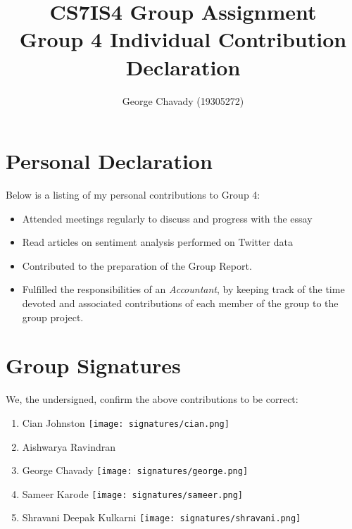 \documentclass[a4paper,10pt]{article}
\begin{document}
\title{
    CS7IS4 Group Assignment \\
    \large Group 4 Individual Contribution Declaration
}
\author{
    George Chavady (19305272)
}

\maketitle

\section{Personal Declaration}

Below is a listing of my personal contributions to Group 4:

\begin{itemize}
    \item {Attended meetings regularly to discuss and progress with the essay}
    \item {Read articles on sentiment analysis performed on Twitter data }
    \item{
       Contributed to the preparation of the Group Report.
    }
    \item{
        Fulfilled the responsibilities of an \textit{Accountant}, by keeping track of the time devoted and associated contributions of each member of the group to the group project.
    }
\end{itemize}

\section{Group Signatures}

We, the undersigned, confirm the above contributions to be correct:

\begin{enumerate}
    \item{
        Cian Johnston \texttt{[image: signatures/cian.png]}
    }
    \item{
        Aishwarya Ravindran
    }
    \item{
        George Chavady \texttt{[image: signatures/george.png]}
    }
    \item{
        Sameer Karode \texttt{[image: signatures/sameer.png]}
    }
    \item{
        Shravani Deepak Kulkarni \texttt{[image: signatures/shravani.png]}
    }

\end{enumerate}
\end{document}
